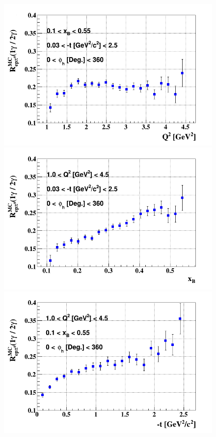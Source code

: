 \begin{figure}[tpb]
\centering
\includegraphics[scale=0.30]{fig_dvcs/epgamma_eppi0_Q2.png}
\includegraphics[scale=0.30]{fig_dvcs/epgamma_eppi0_xB.png}
\includegraphics[scale=0.30]{fig_dvcs/epgamma_eppi0_t.png}

\end{figure}
